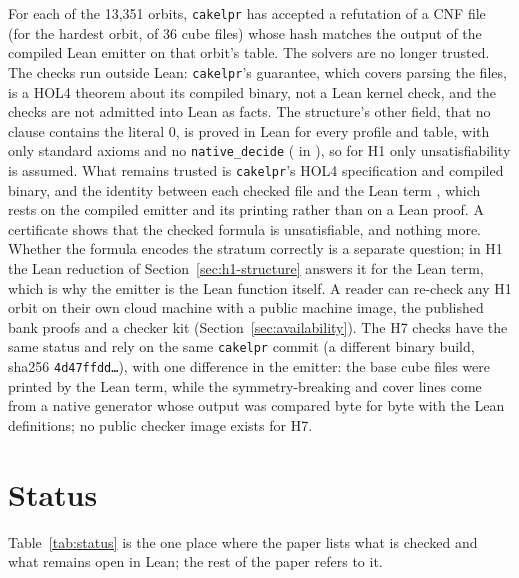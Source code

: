 \documentclass{anvil-paper}
\newcommand{\repocommitvtwo}{bfb1817446dd69da4d5fc1ea148a0ca9a8b0c9e2}
\newcommand{\repofilevtwo}[2]{\href{https://github.com/rjwalters/lean-genius/blob/\repocommitvtwo/#1}{\lean{#2}}}
\newcommand{\cakelpr}{\texttt{cake\textunderscore lpr}}
\theoremstyle{definition}
\begin{document}
For each of the 13,351 orbits, \cakelpr{} has accepted a refutation of a CNF file (for the hardest orbit, of 36 cube files) whose hash matches the output of the compiled Lean emitter on that orbit's table. The solvers are no longer trusted. The checks run outside Lean: \cakelpr{}'s guarantee, which covers parsing the files, is a HOL4 theorem about its compiled binary, not a Lean kernel check, and the checks are not admitted into Lean as  facts. The structure's other field, that no clause contains the literal $0$, is proved in Lean for every profile and table, with only standard axioms and no \texttt{native\_decide} ( in \repofilevtwo{proofs/Proofs/Erdos85OneHighV2InventoryNonzero.lean}{Erdos85OneHighV2InventoryNonzero.lean}), so for H1 only unsatisfiability is assumed. What remains trusted is \cakelpr{}'s HOL4 specification and compiled binary, and the identity between each checked file and the Lean term , which rests on the compiled emitter and its printing rather than on a Lean proof. A certificate shows that the checked formula is unsatisfiable, and nothing more. Whether the formula encodes the stratum correctly is a separate question; in H1 the Lean reduction of Section~\ref{sec:h1-structure} answers it for the Lean term, which is why the emitter is the Lean function itself. A reader can re-check any H1 orbit on their own cloud machine with a public machine image, the published bank proofs and a checker kit (Section~\ref{sec:availability}). The H7 checks have the same status and rely on the same \cakelpr{} commit (a different binary build, sha256 \texttt{4d47ffdd\ldots}), with one difference in the emitter: the base cube files were printed by the Lean term, while the symmetry-breaking and cover lines come from a native generator whose output was compared byte for byte with the Lean definitions; no public checker image exists for H7.

\section{Status}\label{sec:status}

Table~\ref{tab:status} is the one place where the paper lists what is checked and what remains open in Lean; the rest of the paper refers to it.
\end{document}

